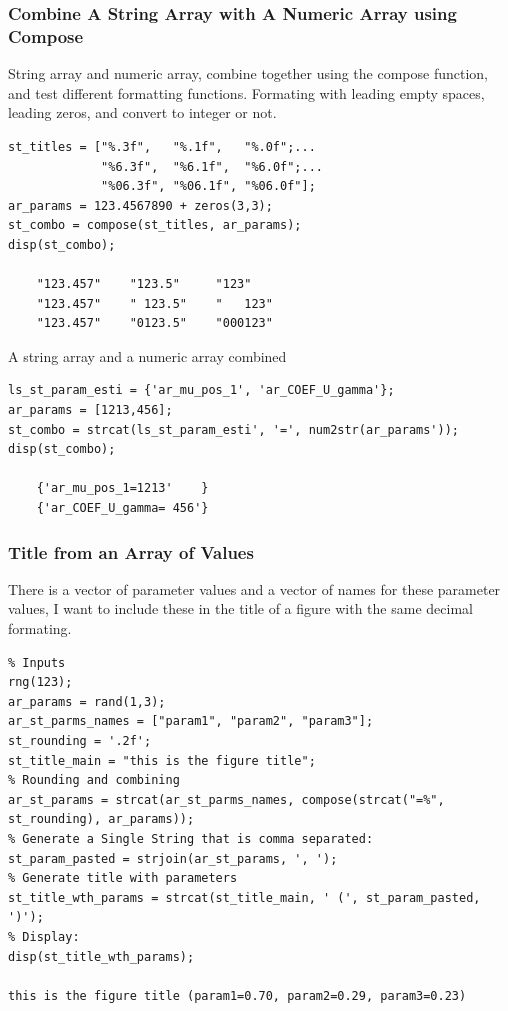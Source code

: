 \documentclass[
]{book}
\begin{document}
\hypertarget{combine-a-string-array-with-a-numeric-array-using-compose}{%
\subsubsection{Combine A String Array with A Numeric Array using Compose}\label{combine-a-string-array-with-a-numeric-array-using-compose}}

String array and numeric array, combine together using the compose
function, and test different formatting functions. Formating with
leading empty spaces, leading zeros, and convert to integer or not.

\begin{verbatim}
st_titles = ["%.3f",   "%.1f",   "%.0f";...
             "%6.3f",  "%6.1f",  "%6.0f";...
             "%06.3f", "%06.1f", "%06.0f"];
ar_params = 123.4567890 + zeros(3,3);
st_combo = compose(st_titles, ar_params);
disp(st_combo);

    "123.457"    "123.5"     "123"   
    "123.457"    " 123.5"    "   123"
    "123.457"    "0123.5"    "000123"
\end{verbatim}

A string array and a numeric array combined

\begin{verbatim}
ls_st_param_esti = {'ar_mu_pos_1', 'ar_COEF_U_gamma'};
ar_params = [1213,456];
st_combo = strcat(ls_st_param_esti', '=', num2str(ar_params'));
disp(st_combo);

    {'ar_mu_pos_1=1213'    }
    {'ar_COEF_U_gamma= 456'}
\end{verbatim}

\hypertarget{title-from-an-array-of-values}{%
\subsubsection{Title from an Array of Values}\label{title-from-an-array-of-values}}

There is a vector of parameter values and a vector of names for these
parameter values, I want to include these in the title of a figure with
the same decimal formating.

\begin{verbatim}
% Inputs
rng(123);
ar_params = rand(1,3);
ar_st_parms_names = ["param1", "param2", "param3"];
st_rounding = '.2f';
st_title_main = "this is the figure title";
% Rounding and combining
ar_st_params = strcat(ar_st_parms_names, compose(strcat("=%", st_rounding), ar_params));
% Generate a Single String that is comma separated:
st_param_pasted = strjoin(ar_st_params, ', ');
% Generate title with parameters
st_title_wth_params = strcat(st_title_main, ' (', st_param_pasted, ')');
% Display:
disp(st_title_wth_params);

this is the figure title (param1=0.70, param2=0.29, param3=0.23)
\end{verbatim}
\end{document}

